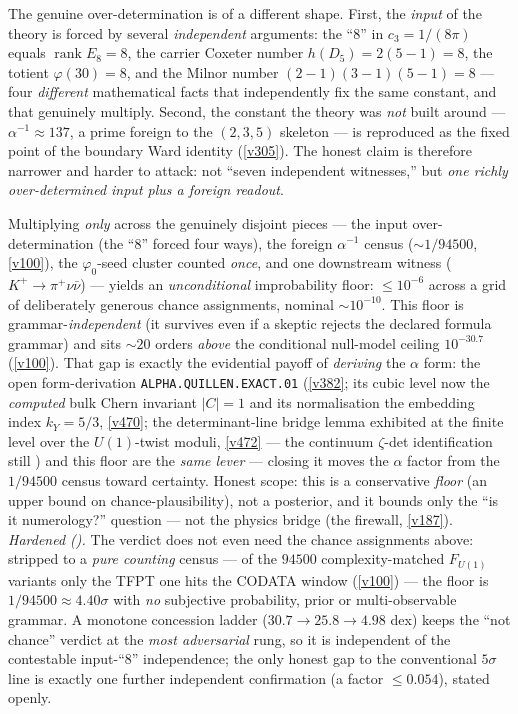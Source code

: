 \documentclass[11pt,a4paper]{article}
\begin{document}
\begin{keybox}
The genuine over-determination is of a different shape. First, the \emph{input} of the theory is forced
by several \emph{independent} arguments: the ``$8$'' in $c_3=1/(8\pi)$ equals $\operatorname{rank}E_8=8$,
the carrier Coxeter number $h(D_5)=2(5{-}1)=8$, the totient $\varphi(30)=8$, and the Milnor number
$(2{-}1)(3{-}1)(5{-}1)=8$ --- four \emph{different} mathematical facts that independently fix the same
constant, and that genuinely multiply. Second, the constant the theory was \emph{not} built around ---
$\alpha^{-1}\approx 137$, a prime foreign to the $(2,3,5)$ skeleton --- is reproduced as the fixed point
of the boundary Ward identity (\vref{v305}). The honest claim is therefore narrower and harder to attack:
not ``seven independent witnesses,'' but \emph{one richly over-determined input plus a foreign readout}.
\end{keybox}
\begin{keybox}
Multiplying \emph{only} across the genuinely disjoint pieces --- the input over-determination (the ``$8$''
forced four ways), the foreign $\alpha^{-1}$ census ($\sim1/94500$, \vref{v100}), the $\varphi_0$-seed cluster
counted \emph{once}, and one downstream witness ($K^+\!\to\!\pi^+\nu\bar\nu$) --- yields an \emph{unconditional}
improbability floor: $\le 10^{-6}$ across a grid of deliberately generous chance assignments, nominal
$\sim 10^{-10}$. This floor is grammar-\emph{independent} (it survives even if a skeptic rejects the declared
formula grammar) and sits $\sim20$ orders \emph{above} the conditional null-model ceiling $10^{-30.7}$
(\vref{v100}). That gap is exactly the evidential payoff of \emph{deriving} the $\alpha$ form: the open
form-derivation \texttt{ALPHA.QUILLEN.EXACT.01} (\vref{v382}; its cubic level now the \emph{computed} bulk Chern
invariant $|C|{=}1$ and its normalisation the embedding index $k_Y{=}5/3$, \vref{v470}; the determinant-line
bridge lemma exhibited at the finite level over the $U(1)$-twist moduli, \vref{v472} --- the continuum
$\zeta$-det identification still \mO) and this
floor are the \emph{same lever} ---
closing it moves the $\alpha$ factor from the $1/94500$ census toward certainty. Honest scope: this is a
conservative \emph{floor} (an upper bound on chance-plausibility), not a posterior, and it bounds only the
``is it numerology?'' question --- not the physics bridge (the firewall, \vref{v187}).
\emph{Hardened ().} The verdict does not even need the chance assignments
above: stripped to a \emph{pure counting} census --- of the $94500$ complexity-matched $F_{U(1)}$ variants
only the TFPT one hits the CODATA window (\vref{v100}) --- the floor is $1/94500\approx4.40\sigma$ with
\emph{no} subjective probability, prior or multi-observable grammar. A monotone concession ladder
($30.7\!\to\!25.8\!\to\!4.98$ dex) keeps the ``not chance'' verdict at the \emph{most adversarial} rung, so
it is independent of the contestable input-``$8$'' independence; the only honest gap to the conventional
$5\sigma$ line is exactly one further independent confirmation (a factor $\le0.054$), stated openly.
\end{keybox}
\end{document}
